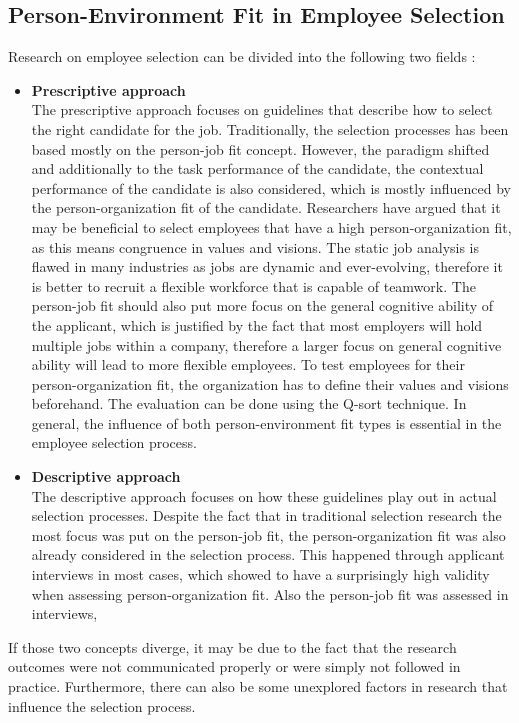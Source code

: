 \documentclass[draft,final]{thesisclass} %
\begin{document}
\subsection{Person-Environment Fit in Employee Selection}
Research on employee selection can be divided into the following two fields \cite[185-186]{po_and_pj_fit_literature_review}:
\begin{itemize}
    \item \textbf{Prescriptive approach}\\
    The prescriptive approach focuses on guidelines that describe how to select the right candidate for the job.
    Traditionally, the selection processes has been based mostly on the person-job fit concept.
    However, the paradigm shifted and additionally to the task performance of the candidate, the contextual performance of the candidate is also considered, which is mostly influenced by the person-organization fit of the candidate.
    Researchers have argued that it may be beneficial to select employees that have a high person-organization fit, as this means congruence in values and visions.
    The static job analysis is flawed in many industries as jobs are dynamic and ever-evolving, therefore it is better to recruit a flexible workforce that is capable of teamwork.
    The person-job fit should also put more focus on the general cognitive ability of the applicant, which is justified by the fact that most employers will hold multiple jobs within a company, therefore a larger focus on general cognitive ability will lead to more flexible employees.
    To test employees for their person-organization fit, the organization has to define their values and visions beforehand.
    The evaluation can be done using the Q-sort technique.
    In general, the influence of both person-environment fit types is essential in the employee selection process.
    \item \textbf{Descriptive approach}\\
    The descriptive approach focuses on how these guidelines play out in actual selection processes.
    Despite the fact that in traditional selection research the most focus was put on the person-job fit, the person-organization fit was also already considered in the selection process.
    This happened through applicant interviews in most cases, which showed to have a surprisingly high validity when assessing person-organization fit.
    Also the person-job fit was assessed in interviews, 
\end{itemize}
If those two concepts diverge, it may be due to the fact that the research outcomes were not communicated properly or were simply not followed in practice.
Furthermore, there can also be some unexplored factors in research that influence the selection process.
\end{document}
